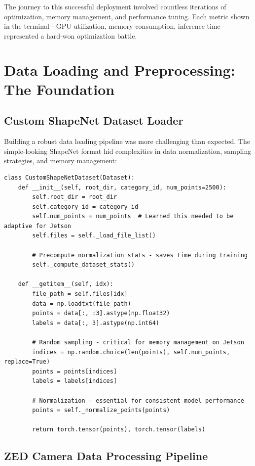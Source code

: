 \documentclass[12pt,a4paper]{report}
\begin{document}
The journey to this successful deployment involved countless iterations of optimization, memory management, and performance tuning. Each metric shown in the terminal - GPU utilization, memory consumption, inference time - represented a hard-won optimization battle.

\section{Data Loading and Preprocessing: The Foundation}

\subsection{Custom ShapeNet Dataset Loader}

Building a robust data loading pipeline was more challenging than expected. The simple-looking ShapeNet format hid complexities in data normalization, sampling strategies, and memory management:

\begin{lstlisting}[caption=Custom ShapeNet Dataset - Built Through Trial and Error, label=lst:shapenet_dataset]
class CustomShapeNetDataset(Dataset):
    def __init__(self, root_dir, category_id, num_points=2500):
        self.root_dir = root_dir
        self.category_id = category_id
        self.num_points = num_points  # Learned this needed to be adaptive for Jetson
        self.files = self._load_file_list()
        
        # Precompute normalization stats - saves time during training
        self._compute_dataset_stats()

    def __getitem__(self, idx):
        file_path = self.files[idx]
        data = np.loadtxt(file_path)
        points = data[:, :3].astype(np.float32)
        labels = data[:, 3].astype(np.int64)

        # Random sampling - critical for memory management on Jetson
        indices = np.random.choice(len(points), self.num_points, replace=True)
        points = points[indices]
        labels = labels[indices]

        # Normalization - essential for consistent model performance
        points = self._normalize_points(points)

        return torch.tensor(points), torch.tensor(labels)
\end{lstlisting}

\subsection{ZED Camera Data Processing Pipeline}
\end{document}
